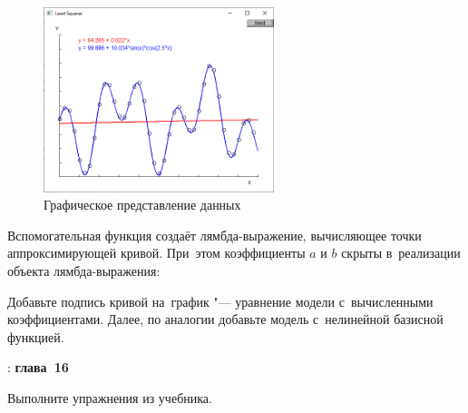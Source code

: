 
\begin{figure}[h]
    {\centering
        \includegraphics[width=0.6\textwidth]{images/least_squares_graphing.png}

    }
    \caption{Графическое представление данных}
\end{figure}

Вспомогательная функция  создаёт лямбда-выражение, вычисляющее точки аппроксимирующей кривой. При~этом коэффициенты \(a\) и \(b\) скрыты в~реализации объекта лямбда-выражения:


Добавьте подпись кривой на~график "--- уравнение модели с~вычисленными коэффициентами. Далее, по аналогии добавьте модель с~нелинейной базисной функцией.



\WhatToReadSection
\textcite{Stroustrup:2016:ru}: \textbf{глава~16}



\ExercisesSection
\begin{exercise}
\item Выполните упражнения из  учебника.

\end{exercise}
